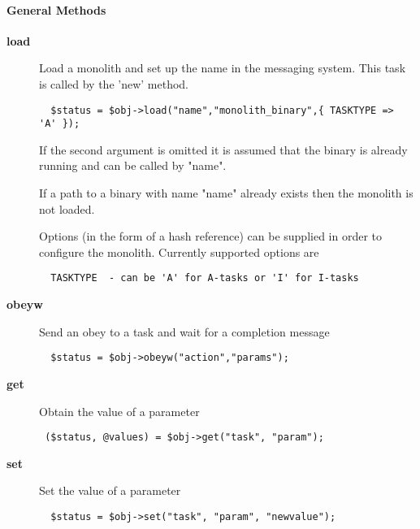\paragraph*{General Methods\label{ORAC::Msg::Task::ADAM_General_Methods}}
\begin{description}

\item[\textbf{load}] \mbox{}

Load a monolith and set up the name in the messaging system.
This task is called by the 'new' method.

\begin{verbatim}
  $status = $obj->load("name","monolith_binary",{ TASKTYPE => 'A' });
\end{verbatim}


If the second argument is omitted it is assumed that the binary
is already running and can be called by "name".



If a path to a binary with name "name" already exists then the monolith
is not loaded.



Options (in the form of a hash reference) can be supplied
in order to configure the monolith. Currently supported options
are

\begin{verbatim}
  TASKTYPE  - can be 'A' for A-tasks or 'I' for I-tasks
\end{verbatim}

\item[\textbf{obeyw}] \mbox{}

Send an obey to a task and wait for a completion message

\begin{verbatim}
  $status = $obj->obeyw("action","params");
\end{verbatim}

\item[\textbf{get}] \mbox{}

Obtain the value of a parameter

\begin{verbatim}
 ($status, @values) = $obj->get("task", "param");
\end{verbatim}

\item[\textbf{set}] \mbox{}

Set the value of a parameter

\begin{verbatim}
  $status = $obj->set("task", "param", "newvalue");
\end{verbatim}


\end{description}
